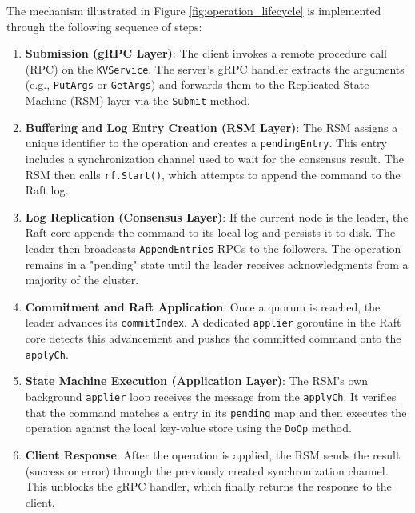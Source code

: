 The mechanism illustrated in Figure \ref{fig:operation_lifecycle} is implemented through the following sequence of steps:

\begin{enumerate}
    \item \textbf{Submission (gRPC Layer)}: The client invokes a remote procedure call (RPC) on the \texttt{KVService}. The server's gRPC handler extracts the arguments (e.g., \texttt{PutArgs} or \texttt{GetArgs}) and forwards them to the Replicated State Machine (RSM) layer via the \texttt{Submit} method.
    
    \item \textbf{Buffering and Log Entry Creation (RSM Layer)}: The RSM assigns a unique identifier to the operation and creates a \texttt{pendingEntry}. This entry includes a synchronization channel used to wait for the consensus result. The RSM then calls \texttt{rf.Start()}, which attempts to append the command to the Raft log.
    
    \item \textbf{Log Replication (Consensus Layer)}: If the current node is the leader, the Raft core appends the command to its local log and persists it to disk. The leader then broadcasts \texttt{AppendEntries} RPCs to the followers. The operation remains in a "pending" state until the leader receives acknowledgments from a majority of the cluster.
    
    \item \textbf{Commitment and Raft Application}: Once a quorum is reached, the leader advances its \texttt{commitIndex}. A dedicated \texttt{applier} goroutine in the Raft core detects this advancement and pushes the committed command onto the \texttt{applyCh}.
    
    \item \textbf{State Machine Execution (Application Layer)}: The RSM's own background \texttt{applier} loop receives the message from the \texttt{applyCh}. It verifies that the command matches a entry in its \texttt{pending} map and then executes the operation against the local key-value store using the \texttt{DoOp} method.
    
    \item \textbf{Client Response}: After the operation is applied, the RSM sends the result (success or error) through the previously created synchronization channel. This unblocks the gRPC handler, which finally returns the response to the client.
\end{enumerate}

